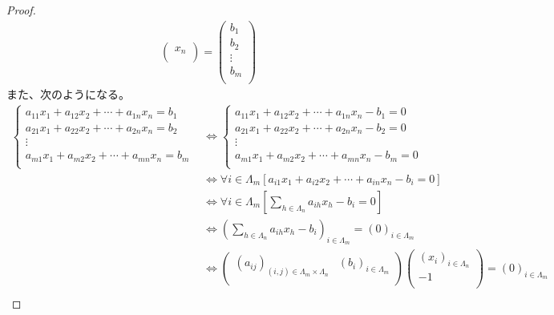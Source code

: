\documentclass[dvipdfmx]{jsarticle}
\begin{document}
\begin{proof}
\begin{align*}
\begin{pmatrix}
x_{n} \\
\end{pmatrix} = \begin{pmatrix}
b_{1} \\
b_{2} \\
 \vdots \\
b_{m} \\
\end{pmatrix}
\end{align*}
また、次のようになる。
\begin{align*}
\left\{ \begin{matrix}
a_{11}x_{1} + a_{12}x_{2} + \cdots + a_{1n}x_{n} = b_{1} \\
a_{21}x_{1} + a_{22}x_{2} + \cdots + a_{2n}x_{n} = b_{2} \\
 \vdots \\
a_{m1}x_{1} + a_{m2}x_{2} + \cdots + a_{mn}x_{n} = b_{m} \\
\end{matrix} \right. &\Leftrightarrow \left\{ \begin{matrix}
a_{11}x_{1} + a_{12}x_{2} + \cdots + a_{1n}x_{n} - b_{1} = 0 \\
a_{21}x_{1} + a_{22}x_{2} + \cdots + a_{2n}x_{n} - b_{2} = 0 \\
 \vdots \\
a_{m1}x_{1} + a_{m2}x_{2} + \cdots + a_{mn}x_{n} - b_{m} = 0 \\
\end{matrix} \right.\ \\
&\Leftrightarrow \forall i \in \varLambda_{m}\left\lbrack a_{i1}x_{1} + a_{i2}x_{2} + \cdots + a_{in}x_{n} - b_{i} = 0 \right\rbrack\\
&\Leftrightarrow \forall i \in \varLambda_{m}\left\lbrack \sum_{h \in \varLambda_{n}} {a_{ih}x_{h}} - b_{i} = 0 \right\rbrack\\
&\Leftrightarrow \left( \sum_{h \in \varLambda_{n}} {a_{ih}x_{h}} - b_{i} \right)_{i \in \varLambda_{m}} = (0)_{i \in \varLambda_{m}}\\
&\Leftrightarrow \begin{pmatrix}
\left( a_{ij} \right)_{(i,j) \in \varLambda_{m} \times \varLambda_{n}} & \left( b_{i} \right)_{i \in \varLambda_{m}} \\
\end{pmatrix}\begin{pmatrix}
\left( x_{i} \right)_{i \in \varLambda_{n}} \\
 - 1 \\
\end{pmatrix} = (0)_{i \in \varLambda_{m}}\\

\end{align*}
\end{proof}
\end{document}
